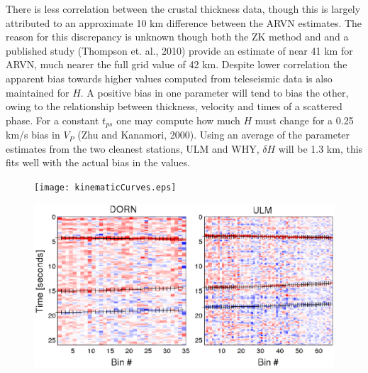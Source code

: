 \documentclass[review]{elsarticle}
\begin{document}
There is less correlation between the crustal thickness data, though this is largely attributed to an approximate 10 km difference between the ARVN estimates. The reason for this discrepancy is unknown though both the ZK method and and a published study (Thompson et. al., 2010) provide an estimate of near 41 km for ARVN, much nearer the full grid value of 42 km. Despite lower correlation the apparent bias towards higher values computed from teleseismic data is also maintained for $H$. A positive bias in one parameter will tend to bias the other, owing to the relationship between thickness, velocity and times of a scattered phase. For a constant $t_{ps}$ one may compute how much $H$ must change for a 0.25 km/s bias in $V_P$ (Zhu and Kanamori, 2000). Using an average of the parameter estimates from the two cleanest stations, ULM and WHY, $\delta H$ will be 1.3 km, this fits well with the actual bias in the values.


\begin{figure}
  \centering
  \texttt{[image: kinematicCurves.eps]}
  \caption{}
  \label{fig:kcurves}
\end{figure}

\begin{figure}
  \centering
  \includegraphics[width=\textwidth]{rfDORNULM.eps}
  \caption{}
  \label{fig:rfs}
\end{figure}
\end{document}
